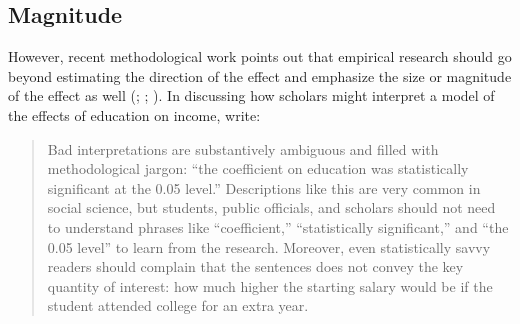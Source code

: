\documentclass[12pt]{article}
\begin{document}

\subsection*{Magnitude}

However, recent methodological work points out that empirical research should go beyond estimating the direction of the effect and emphasize the size or magnitude of the effect as well (\citealt{KingTomzWittenberg2000}; \citealt{HanmerKalkan2013}; \citealt{Gross2014}). In discussing how scholars might interpret a model of the effects of education on income, \citet[p. 348]{KingTomzWittenberg2000} write:

\begin{quote}
Bad interpretations are substantively ambiguous and filled with methodological jargon: ``the coefficient on education was statistically significant at the 0.05 level.'' Descriptions like this are very common in social science, but students, public officials, and scholars should not need to understand phrases like ``coefficient,'' ``statistically significant,'' and ``the 0.05 level'' to learn from the research. Moreover, even statistically savvy readers should complain that the sentences does not convey the key quantity of interest: how much higher the starting salary would be if the student attended college for an extra year.
\end{quote}
\end{document}
